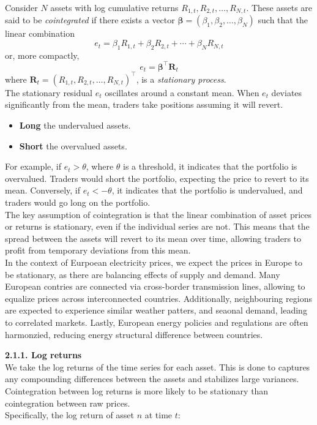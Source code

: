 \documentclass[12pt]{article}
\begin{document}
Consider $N$ assets with log cumulative returns $R_{1,t}, R_{2,t}, \ldots, R_{N,t}$. These assets are said to be \textit{cointegrated} if there exists a vector $\boldsymbol{\beta} = (\beta_1, \beta_2, \ldots, \beta_N)$ such that the linear combination
\[
e_t = \beta_1 R_{1,t} + \beta_2 R_{2,t} + \cdots + \beta_N R_{N,t}
\]
or, more compactly,
\[
e_t = \boldsymbol{\beta}^\top \mathbf{R}_t
\]
where $\mathbf{R}_t = (R_{1,t}, R_{2,t}, \ldots, R_{N,t})^\top$, is a \textit{stationary process}.
\\

The stationary residual $e_t$ oscillates around a constant mean. When $e_t$ deviates significantly from the mean, traders take positions assuming it will revert.
\begin{itemize}
  \item \textbf{Long} the undervalued assets.
  \item \textbf{Short} the overvalued assets.
\end{itemize}

For example, if $e_t > \theta$, where $\theta$ is a threshold, it indicates that the portfolio is overvalued. Traders would short the portfolio, expecting the price to revert to its mean. Conversely, if $e_t < -\theta$, it indicates that the portfolio is undervalued, and traders would go long on the portfolio.
\\

The key assumption of cointegration is that the linear combination of asset prices or returns is stationary, even if the individual series are not. This means that the spread between the assets will revert to its mean over time, allowing traders to profit from temporary deviations from this mean.
\\

In the context of Eurpoean electricity prices, we expect the prices in Europe to be stationary, as there are balancing effects of supply and demand. Many European contries are connected via cross-border transmission lines, allowing to equalize prices across interconnected countries. Additionally, neighbouring regions are expected to experience similar weather patters, and seaonal demand, leading to correlated markets. Lastly, European energy policies and regulations are often harmonzied, reducing energy structural difference between countries.
\\

\vspace{20pt}

\textbf{2.1.1. Log returns}
\\
We take the log returns of the time series for each asset. This is done to captures any compounding differences between the assets and stabilizes large variances. Cointegration between log returns is more likely to be stationary than cointegration between raw prices.
\\
Specifically, the log return of asset $n$ at time $t$:
\end{document}
